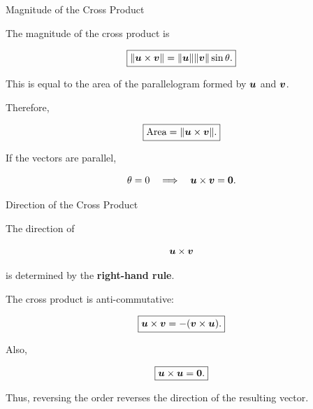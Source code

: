 
\begin{frame}{Magnitude of the Cross Product}

The magnitude of the cross product is

\[
\boxed{
\|\bm{u}\times\bm{v}\|
=
\|\bm{u}\|
\|\bm{v}\|
\sin\theta.
}
\]

This is equal to the area of the parallelogram formed by
$\bm{u}$ and $\bm{v}$.

\vspace{0.5cm}

Therefore,

\[
\boxed{
\text{Area}
=
\|\bm{u}\times\bm{v}\|.
}
\]

\vspace{0.3cm}

If the vectors are parallel,

\[
\theta=0
\quad\Longrightarrow\quad
\bm{u}\times\bm{v}=\mathbf{0}.
\]

\end{frame}



\begin{frame}{Direction of the Cross Product}

The direction of

\[
\bm{u}\times\bm{v}
\]

is determined by the \textbf{right-hand rule}.

\vspace{0.4cm}

The cross product is anti-commutative:

\[
\boxed{
\bm{u}\times\bm{v}
=
-(\bm{v}\times\bm{u}).
}
\]

Also,

\[
\boxed{
\bm{u}\times\bm{u}
=
\mathbf{0}.
}
\]

Thus, reversing the order reverses the direction of the
resulting vector.

\end{frame}



